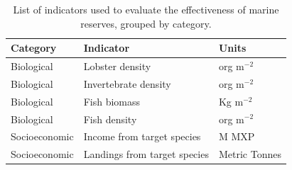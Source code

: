 \documentclass{frontiersSCNS}
\theoremstyle{definition}
\theoremstyle{definition}
\theoremstyle{definition}
\theoremstyle{remark}
\begin{document}
\begin{table}[H]

\caption{\label{tab:unnamed-chunk-10}\label{table:indicators}List of indicators used to evaluate the effectiveness of marine reserves, grouped by category.}
\centering
\begin{tabular}[t]{l|l|l}
\hline
Category & Indicator & Units\\
\hline
Biological & Lobster density & org $\mathrm{m}^{-2}$\\
\hline
Biological & Invertebrate density & org $\mathrm{m}^{-2}$\\
\hline
Biological & Fish biomass & Kg $\mathrm{m}^{-2}$\\
\hline
Biological & Fish density & org $\mathrm{m}^{-2}$\\
\hline
Socioeconomic & Income from target species & M MXP\\
\hline
Socioeconomic & Landings from target species & Metric Tonnes\\
\hline
\end{tabular}
\end{table}
\end{document}
